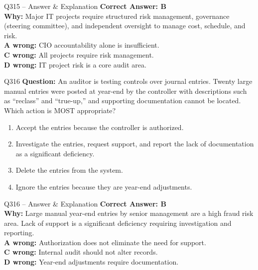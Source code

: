 \documentclass[aspectratio=169,10pt]{beamer}
\begin{document}
	\begin{frame}[t]{Q315 -- Answer \& Explanation}
		\small
		\textbf{Correct Answer: B} \\[4pt]
		\textbf{Why:} Major IT projects require structured risk management, governance (steering committee), and independent oversight to manage cost, schedule, and risk. \\[4pt]
		\textbf{A wrong:} CIO accountability alone is insufficient. \\[2pt]
		\textbf{C wrong:} All projects require risk management. \\[2pt]
		\textbf{D wrong:} IT project risk is a core audit area.
	\end{frame}
	
	\begin{frame}[t]{Q316}
		\small
		\textbf{Question:} An auditor is testing controls over journal entries. Twenty large manual entries were posted at year-end by the controller with descriptions such as ``reclass'' and ``true-up,'' and supporting documentation cannot be located. Which action is MOST appropriate?
		\begin{enumerate}[label=\Alph*.,itemsep=1pt,topsep=2pt]
			\item Accept the entries because the controller is authorized.
			\item Investigate the entries, request support, and report the lack of documentation as a significant deficiency.
			\item Delete the entries from the system.
			\item Ignore the entries because they are year-end adjustments.
		\end{enumerate}
	\end{frame}
	
	\begin{frame}[t]{Q316 -- Answer \& Explanation}
		\small
		\textbf{Correct Answer: B} \\[4pt]
		\textbf{Why:} Large manual year-end entries by senior management are a high fraud risk area. Lack of support is a significant deficiency requiring investigation and reporting. \\[4pt]
		\textbf{A wrong:} Authorization does not eliminate the need for support. \\[2pt]
		\textbf{C wrong:} Internal audit should not alter records. \\[2pt]
		\textbf{D wrong:} Year-end adjustments require documentation.
	\end{frame}
	
\end{document}
